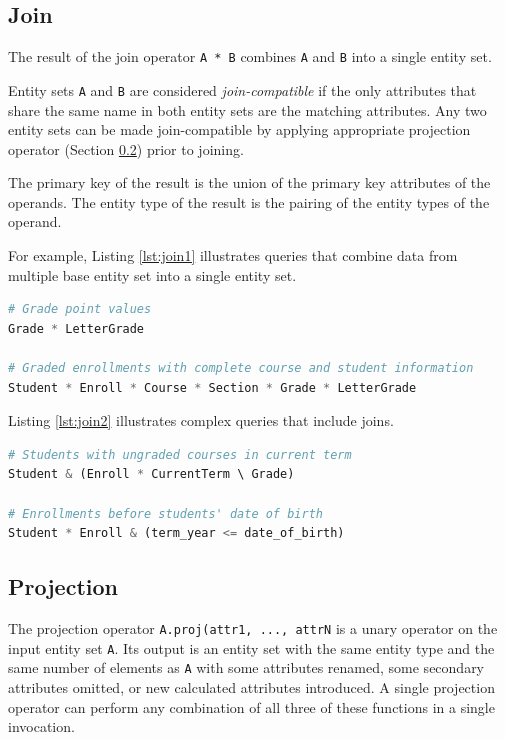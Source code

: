 \documentclass[letter,10pt]{article}
\begin{document}
\subsection{Join}\label{sec:join}
The result of the join operator \lstinline$A * B$ combines \lstinline$A$ and \lstinline$B$ into a single entity set.

Entity sets \lstinline$A$ and \lstinline$B$ are considered \emph{join-compatible} if the only attributes that share the same name in both entity sets are the matching attributes.
Any two entity sets can be made join-compatible by applying appropriate projection operator (Section \ref{sec:proj}) prior to joining.

The primary key of the result is the union of the primary key attributes of the operands. 
The entity type of the result is the pairing of the entity types of the operand.  

For example, Listing \ref{lst:join1} illustrates queries that combine data from multiple base entity set into a single entity set.
\begin{lstlisting}[language=Python, caption={Combining entities.}, label={lst:join1}]
# Grade point values
Grade * LetterGrade

# Graded enrollments with complete course and student information
Student * Enroll * Course * Section * Grade * LetterGrade
\end{lstlisting}

Listing \ref{lst:join2} illustrates complex queries that include joins.
\begin{lstlisting}[language=Python, caption={Join in expressions.}, label={lst:join2}]
# Students with ungraded courses in current term
Student & (Enroll * CurrentTerm \ Grade)

# Enrollments before students' date of birth
Student * Enroll & (term_year <= date_of_birth)
\end{lstlisting}

\subsection{Projection}\label{sec:proj}
The projection operator \lstinline$A.proj(attr1, ..., attrN$ is a unary operator on the input entity set \lstinline$A$.  
Its output is an entity set with the same entity type and the same number of elements as \lstinline$A$ with some attributes renamed, some secondary attributes omitted, or new calculated attributes introduced.
A single projection operator can perform any combination of all three of these functions in a single invocation. 
\end{document}
